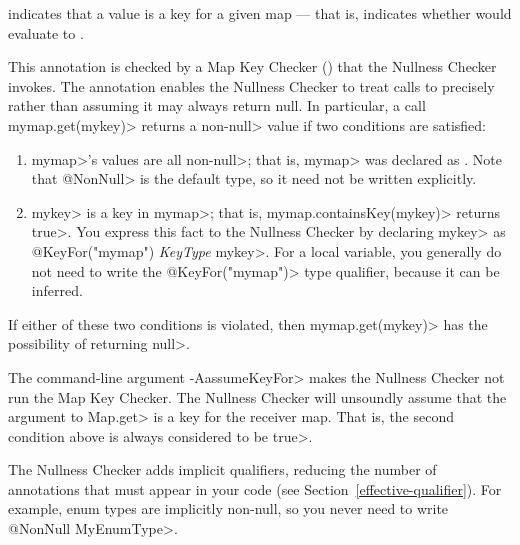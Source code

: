 
\begin{description}
\item[]
\end{description}
    indicates that a value is a key for a given map --- that is, indicates
    whether  would evaluate to .

This annotation is checked by a Map Key Checker
() that the Nullness Checker
invokes.  The  annotation enables
the Nullness Checker to treat calls to
precisely rather than assuming it may always return null.  In particular,
a call \<mymap.get(mykey)> returns a non-\<null> value if two conditions
are satisfied:
\begin{enumerate}
\item \<mymap>'s values are all non-\<null>; that is, \<mymap> was
  declared as .  Note
  that \<@NonNull> is the default type, so it need not be written explicitly.
\item \<mykey> is a key in \<mymap>; that is, \<mymap.containsKey(mykey)>
  returns \<true>.  You express this fact to the Nullness Checker by
  declaring \<mykey> as \<@KeyFor("mymap") \emph{KeyType} mykey>.  For a
  local variable, you generally do not need to write the
  \<@KeyFor("mymap")> type qualifier, because it can be inferred.
\end{enumerate}
\noindent
If either of these two conditions is violated, then \<mymap.get(mykey)> has
the possibility of returning \<null>.

The command-line argument \<-AassumeKeyFor> makes the Nullness Checker not
run the Map Key Checker.  The Nullness Checker will unsoundly assume that
the argument to \<Map.get> is a key for the receiver map.  That is, the
second condition above is always considered to be \<true>.




The Nullness Checker
adds implicit qualifiers, reducing the number of annotations that must
appear in your code (see Section~\ref{effective-qualifier}).
For example, enum types are implicitly non-null, so you never need to write
\<@NonNull MyEnumType>.

